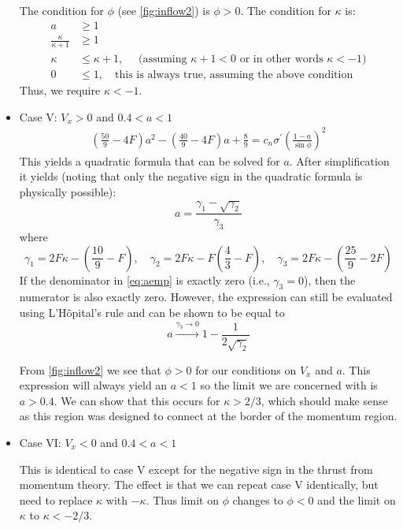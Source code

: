 \documentclass{article}
\begin{document}
\begin{itemize}
The condition for $\phi$ (see \cref{fig:inflow2}) is $\phi > 0$.  The condition for $\kappa$ is:
\begin{equation}
    \begin{aligned}
        a &\ge 1\\
        \frac{\kappa}{\kappa + 1} &\ge 1\\
        \kappa &\le \kappa + 1,\quad \text{ (assuming $\kappa + 1 < 0$ or in other words $\kappa < -1$)} \\
        0 &\le 1,\quad \text{this is always true, assuming the above condition}
    \end{aligned}
\end{equation}
Thus, we require $\kappa < -1$.

\item Case V: $V_x > 0$ and $0.4 < a < 1$
\begin{equation}
\begin{aligned}
\left(\frac{50}{9} - 4F\right) a^2 - \left(\frac{40}{9} - 4F\right) a + \frac{8}{9} = c_n \sigma^\prime \left(\frac{1-a}{\sin\phi}\right)^2
\end{aligned}
\end{equation}
This yields a quadratic formula that can be solved for $a$.  After simplification it yields (noting that only the negative sign in the quadratic formula is physically possible):
\begin{equation}
a = \frac{\gamma_1 - \sqrt{\gamma_2}}{\gamma_3}
\label{eq:aemp}
\end{equation}
where
\begin{equation}
\gamma_1 = 2F\kappa - \left(\frac{10}{9} - F\right)\!, \quad \gamma_2 = 2F\kappa - F\left(\frac{4}{3} - F\right)\!,\quad
\gamma_3 = 2F\kappa - \left(\frac{25}{9} - 2F\right)
\label{eq:gamma}
\end{equation}
If the denominator in \cref{eq:aemp} is exactly zero (i.e., $\gamma_3 = 0$), then the numerator is also exactly zero.  However, the expression can still be evaluated using L'H\^{o}pital's rule and can be shown to be equal to
\begin{equation}
    a \xrightarrow{\gamma_3 \to 0} 1 - \frac{1}{2\sqrt{\gamma_2}}
    \label{eq:aconverge}
\end{equation}

From \cref{fig:inflow2} we see that $\phi > 0$ for our conditions on $V_x$ and $a$.  This expression will always yield an $a < 1$ so the limit we are concerned with is $a > 0.4$.  We can show that this occurs for $\kappa > 2/3$, which should make sense as this region was designed to connect at the border of the momentum region.


\item Case VI: $V_x < 0$ and $0.4 < a < 1$

This is identical to case V except for the negative sign in the thrust from momentum theory.  The effect is that we can repeat case V identically, but need to replace $\kappa$ with $-\kappa$.  Thus limit on $\phi$ changes to $\phi < 0$ and the limit on $\kappa$ to $\kappa < -2/3$.

\end{itemize}
\end{document}
